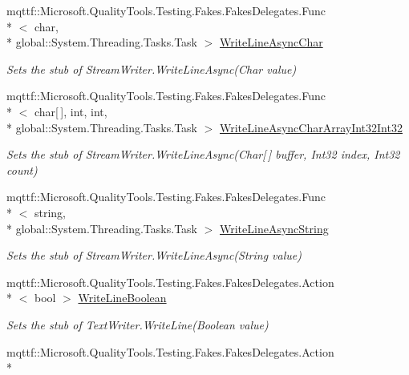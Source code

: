 \begin{DoxyCompactItemize}
mqttf\-::\-Microsoft.\-Quality\-Tools.\-Testing.\-Fakes.\-Fakes\-Delegates.\-Func\\*
$<$ char, \\*
global\-::\-System.\-Threading.\-Tasks.\-Task $>$ \hyperlink{class_system_1_1_i_o_1_1_fakes_1_1_stub_stream_writer_ac06eae1f98b30428b9dc8d276f8c08d8}{Write\-Line\-Async\-Char}
\begin{DoxyCompactList}\small\item\em Sets the stub of Stream\-Writer.\-Write\-Line\-Async(\-Char value)\end{DoxyCompactList}\item 
mqttf\-::\-Microsoft.\-Quality\-Tools.\-Testing.\-Fakes.\-Fakes\-Delegates.\-Func\\*
$<$ char\mbox{[}$\,$\mbox{]}, int, int, \\*
global\-::\-System.\-Threading.\-Tasks.\-Task $>$ \hyperlink{class_system_1_1_i_o_1_1_fakes_1_1_stub_stream_writer_a54aa1eb981e617303b2c23dc9e2903e6}{Write\-Line\-Async\-Char\-Array\-Int32\-Int32}
\begin{DoxyCompactList}\small\item\em Sets the stub of Stream\-Writer.\-Write\-Line\-Async(\-Char\mbox{[}$\,$\mbox{]} buffer, Int32 index, Int32 count)\end{DoxyCompactList}\item 
mqttf\-::\-Microsoft.\-Quality\-Tools.\-Testing.\-Fakes.\-Fakes\-Delegates.\-Func\\*
$<$ string, \\*
global\-::\-System.\-Threading.\-Tasks.\-Task $>$ \hyperlink{class_system_1_1_i_o_1_1_fakes_1_1_stub_stream_writer_a28c797e98a6d6888d8c5ea1bfafd284b}{Write\-Line\-Async\-String}
\begin{DoxyCompactList}\small\item\em Sets the stub of Stream\-Writer.\-Write\-Line\-Async(\-String value)\end{DoxyCompactList}\item 
mqttf\-::\-Microsoft.\-Quality\-Tools.\-Testing.\-Fakes.\-Fakes\-Delegates.\-Action\\*
$<$ bool $>$ \hyperlink{class_system_1_1_i_o_1_1_fakes_1_1_stub_stream_writer_a9ceba865359a6c304cd17d9eebd85bf4}{Write\-Line\-Boolean}
\begin{DoxyCompactList}\small\item\em Sets the stub of Text\-Writer.\-Write\-Line(\-Boolean value)\end{DoxyCompactList}\item 
mqttf\-::\-Microsoft.\-Quality\-Tools.\-Testing.\-Fakes.\-Fakes\-Delegates.\-Action\\*

\end{DoxyCompactItemize}

